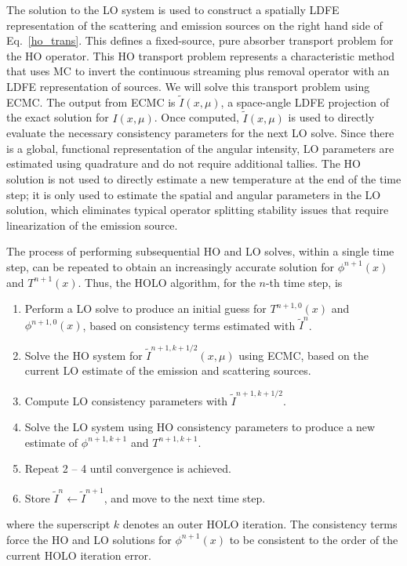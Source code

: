 \documentclass{mc2013}
\begin{document}
The solution to the LO system is used to construct a spatially LDFE representation of
the scattering and emission sources on the right hand side of Eq.~\eqref{ho_trans}.  This defines a fixed-source, pure absorber
transport problem for the HO operator. This HO transport problem represents a characteristic method that uses MC to
invert the continuous streaming plus removal operator with an LDFE representation of
sources. We will solve this transport problem using ECMC.  The output from ECMC is
$\tilde{I}(x,\mu)$, a space-angle LDFE projection of the exact solution for
$I(x,\mu)$.  Once computed, $\tilde{I}(x,\mu)$ is used
to directly evaluate the necessary consistency parameters for the next LO solve.  Since there is a global, functional representation of
the angular intensity,  LO parameters are estimated using quadrature and do not
require additional tallies.  The HO solution is not used to directly estimate a new
temperature at the end of the time step; it is
only used to estimate the spatial and angular parameters in the LO solution, which eliminates
typical operator splitting stability issues that require linearization of the emission source.

The process of performing subsequential HO and LO solves, within a single time step, can be repeated to obtain an increasingly accurate solution for $\phi^{n+1}(x)$ and $T^{n+1}(x)$.  Thus, the HOLO algorithm, for the $n$-th time step, is
\begin{enumerate}
\item Perform a LO solve to produce an initial guess for $T^{n+1,0}(x)$
    and $\phi^{n+1,0}(x)$, based on consistency terms estimated with $\tilde{I}^{n}$.
\item Solve the HO system for $\tilde{I}^{n+1,k+1/2}(x,\mu)$ using ECMC, based on the current
    LO estimate of the emission and scattering sources.%
\item Compute LO consistency parameters with $\tilde{I}^{n+1,k+1/2}$.  
\item Solve the LO system using HO consistency parameters to produce a new
    estimate of $\phi^{n+1,k+1}$ and $T^{n+1,k+1}$.
\item Repeat 2 -- 4 until convergence is achieved.
\item Store $\tilde{I}^{n}\leftarrow\tilde{I}^{n+1}$, and move to the next time step.
\end{enumerate}
where the superscript $k$ denotes an outer HOLO iteration.
The consistency terms force the HO
and LO solutions for $\phi^{n+1}(x)$ to be consistent to the order of the current HOLO
iteration error.
\end{document}
